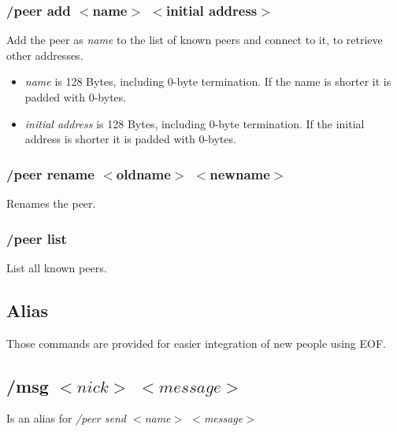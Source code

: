 \documentclass[12pt,a4paper]{article}
\begin{document}
\subsubsection{/peer add $<$name$>$ $<$initial address$>$}
Add the peer as \textit{name} to the list of known peers
and connect to it, to retrieve other addresses.
\begin{itemize}
\item \textit{name} is 128 Bytes, including 0-byte termination.
If the name is shorter it is padded with 0-bytes.
\item \textit{initial address} is 128 Bytes, including 0-byte termination.
If the initial address is shorter it is padded with 0-bytes.
\end{itemize}
\subsubsection{/peer rename $<$oldname$>$ $<$newname$>$}
Renames the peer.
\subsubsection{/peer list}
List all known peers.

\subsection{Alias}
Those commands are provided for easier integration of
new people using EOF.
\subsection{/msg $<nick>$ $<message>$}
Is an alias for \textit{/peer send $<$name$>$ $<$message$>$}
\end{document}
